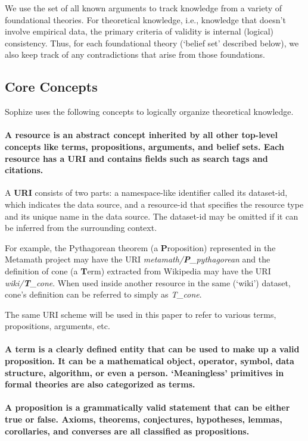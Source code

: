 \documentclass[runningheads]{llncs}
\begin{document}
We use the set of all known arguments to track knowledge from a variety of foundational theories. For theoretical knowledge, i.e., knowledge that doesn't involve empirical data, the primary criteria of validity is internal (logical) consistency. Thus, for each foundational theory (`belief set' described below), we also keep track of any contradictions that arise from those foundations.

\subsection{Core Concepts}
Sophize uses the following concepts to logically organize theoretical knowledge.

\paragraph{A \textbf{resource} is an abstract concept inherited by all other top-level concepts like terms, propositions, arguments, and belief sets. Each resource has a URI and contains fields such as search tags and citations.}

A \textbf{URI} consists of two parts: a namespace-like identifier called its dataset-id, which indicates the data source, and a resource-id that specifies the resource type and its unique name in the data source. The dataset-id may be omitted if it can be inferred from the surrounding context.

For example, the Pythagorean theorem (a \textbf{P}roposition) represented in the Metamath project may have the URI \emph{metamath/\textbf{P}\_pythagorean} and the definition of cone (a \textbf{T}erm) extracted from Wikipedia may have the URI \emph{wiki/\textbf{T}\_cone}. When used inside another resource in the same (`wiki') dataset, cone's definition can be referred to simply as \emph{T\_cone}.

The same URI scheme will be used in this paper to refer to various terms, propositions, arguments, etc.

\paragraph{A \textbf{term} is a clearly defined entity that can be used to make up a valid proposition. It can be a mathematical object, operator, symbol, data structure, algorithm, or even a person. `Meaningless' primitives in formal theories are also categorized as terms.}

\paragraph{A \textbf{proposition} is a grammatically valid statement that can be either true or false. Axioms, theorems, conjectures, hypotheses, lemmas, corollaries, and converses are all classified as propositions.}
\end{document}
